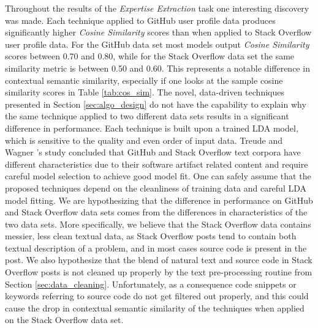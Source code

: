         
        Throughout the results of the \emph{Expertise Extraction} task one interesting discovery was made. Each technique applied to GitHub user profile data produces significantly higher \emph{Cosine Similarity} scores than when applied to Stack Overflow user profile data. For the GitHub data set most models output \emph{Cosine Similarity} scores between 0.70 and 0.80, while for the Stack Overflow data set the same similarity metric is between 0.50 and 0.60. This represents a notable difference in contextual semantic similarity, especially if one looks at the sample cosine similarity scores in Table \ref{tab:cos_sim}. The novel, data-driven techniques presented in Section \ref{sec:algo_design} do not have the capability to explain why the same technique applied to two different data sets results in a significant difference in performance. Each technique is built upon a trained LDA model, which is sensitive to the quality and even order of input data. Treude and Wagner \cite{treude2019predicting}'s study concluded that GitHub and Stack Overflow text corpora have different characteristics due to their software artifact related content and require careful model selection to achieve good model fit. One can safely assume that the proposed techniques depend on the cleanliness of training data and careful LDA model fitting. We are hypothesizing that the difference in performance on GitHub and Stack Overflow data sets comes from the differences in characteristics of the two data sets. More specifically, we believe that the Stack Overflow data contains messier, less clean textual data, as Stack Overflow posts tend to contain both textual description of a problem, and in most cases source code is present in the post. We also hypothesize that the blend of natural text and source code in Stack Overflow posts is not cleaned up properly by the text pre-processing routine from Section \ref{sec:data_cleaning}. Unfortunately, as a consequence code snippets or keywords referring to source code do not get filtered out properly, and this could cause the drop in contextual semantic similarity of the techniques when applied on the Stack Overflow data set.
        
